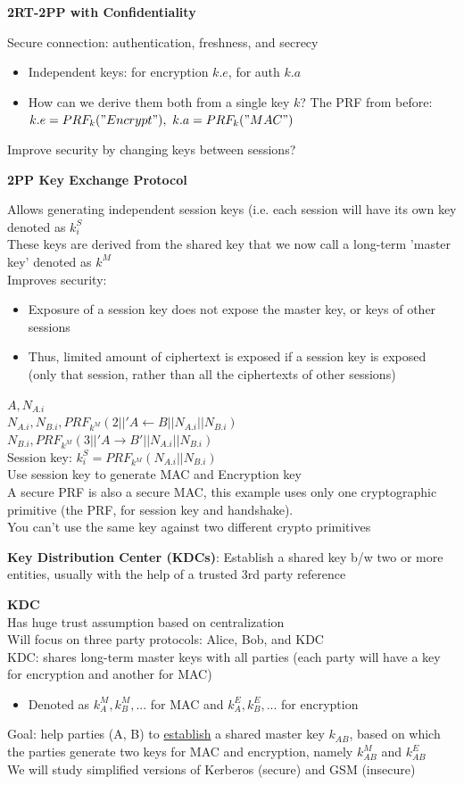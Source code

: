 \documentclass{article}
\begin{document}
\textbf{2RT-2PP with Confidentiality}

Secure connection: authentication, freshness, and secrecy\begin{itemize}
	\item Independent keys: for encryption $k.e$, for auth $k.a$
	\item How can we derive them both from a single key $k$? The PRF from before: $k.e=PRF_k("Encrypt"),\ k.a=PRF_k("MAC")$
\end{itemize}
Improve security by changing keys between sessions?

\textbf{2PP Key Exchange Protocol}

Allows generating independent session keys (i.e. each session will have its own key denoted as $k_i^S$\\
These keys are derived from the shared key that we now call a long-term 'master key' denoted as $k^M$\\
Improves security:\begin{itemize}
	\item Exposure of a session key does not expose the master key, or keys of other sessions
	\item Thus, limited amount of ciphertext is exposed if a session key is exposed (only that session, rather than all the ciphertexts of other sessions)
\end{itemize}
$A,N_{A.i}$\\
$N_{A.i},N_{B.i}, PRF_{k^M}(2||'A\leftarrow B||N_{A.i}||N_{B.i})$\\
$N_{B.i},PRF_{k^M}(3||'A\rightarrow B'||N_{A.i}||N_{B.i})$\\
Session key: $k_i^S = PRF_{k^M}(N_{A.i}||N_{B.i})$\\
Use session key to generate MAC and Encryption key\\
A secure PRF is also a secure MAC, this example uses only one cryptographic primitive (the PRF, for session key and handshake).\\
You can't use the same key against two different crypto primitives

\textbf{Key Distribution Center (KDCs)}: Establish a shared key b/w two or more entities, usually with the help of a trusted 3rd party reference

\textbf{KDC}\\
Has huge trust assumption based on centralization\\
Will focus on three party protocols: Alice, Bob, and KDC\\
KDC: shares long-term master keys with all parties (each party will have a key for encryption and another for MAC)\begin{itemize}
	\item Denoted as $k_A^M,k_B^M,...$ for MAC and $k_A^E,k_B^E,...$ for encryption
\end{itemize}
Goal: help parties (A, B) to \underline{establish} a shared master key $k_{AB}$, based on which the parties generate two keys for MAC and encryption, namely $k^M_{AB}$ and $k^E_{AB}$\\
We will study simplified versions of Kerberos (secure) and GSM (insecure)
\end{document}
